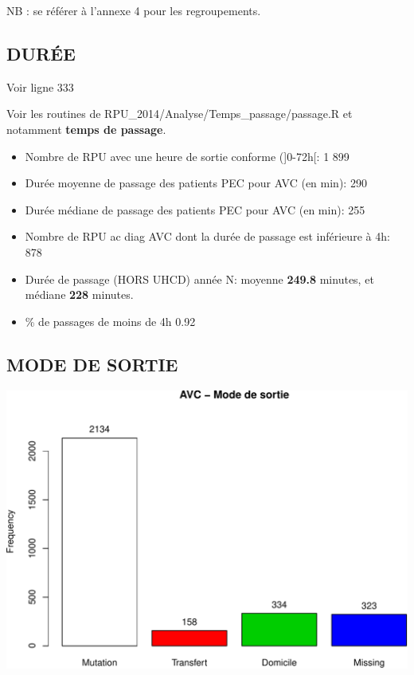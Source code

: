 \documentclass[]{article}
\begin{document}
NB : se référer à l'annexe 4 pour les regroupements.

\subsection{DURÉE}\label{duree-1}

Voir ligne 333

Voir les routines de RPU\_2014/Analyse/Temps\_passage/passage.R et
notamment \textbf{temps de passage}.

\begin{itemize}
\item
  Nombre de RPU avec une heure de sortie conforme ({]}0-72h{[}: 1 899
\item
  Durée moyenne de passage des patients PEC pour AVC (en min): 290
\item
  Durée médiane de passage des patients PEC pour AVC (en min): 255
\item
  Nombre de RPU ac diag AVC dont la durée de passage est inférieure à
  4h: 878
\item
  Durée de passage (HORS UHCD) année N: moyenne \textbf{249.8} minutes,
  et médiane \textbf{228} minutes.
\item
  \% de passages de moins de 4h 0.92
\end{itemize}

\subsection{MODE DE SORTIE}\label{mode-de-sortie-2}

\includegraphics{rapport2014_V4_files/figure-latex/avc_mode_sortie-1.pdf}
\end{document}

